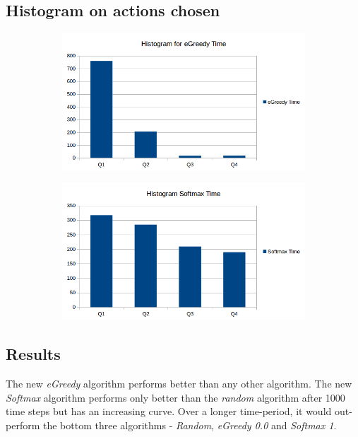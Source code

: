 \documentclass[a4paper, 11pt]{article}
\begin{document}
\subsection{Histogram on actions chosen}

\begin{figure}[H]
\centering
\begin{subfigure}{.5\textwidth}
  \centering
  \includegraphics[width=1\linewidth]{ex1_3_histogram_egreedytime}
\end{subfigure}%
\begin{subfigure}{.5\textwidth}
  \centering
  \includegraphics[width=1\linewidth]{ex1_3_histogram_softmaxtime}
\end{subfigure}%
\end{figure}

\subsection{Results}


The new \textit{eGreedy} algorithm performs better than any other algorithm. The new \textit{Softmax} algorithm performs only better than the \textit{random} algorithm after 1000 time steps but has an increasing curve. Over a longer time-period, it would out-perform the bottom three algorithms - \textit{Random}, \textit{eGreedy 0.0} and \textit{Softmax 1}.
\end{document}
